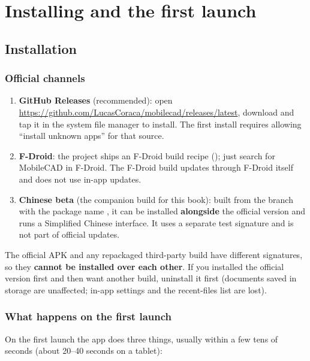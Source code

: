 \chapter{Installing and the first launch}

\section{Installation}

\subsection{Official channels}

\begin{enumerate}
  \item \textbf{GitHub Releases} (recommended): open
        \url{https://github.com/LucasCoraca/mobilecad/releases/latest}, download
         and tap it in the system file manager to install. The first install
        requires allowing “install unknown apps” for that source.
  \item \textbf{F-Droid}: the project ships an F-Droid build recipe (); just search for
        MobileCAD in F-Droid. The F-Droid build updates through F-Droid itself and does not use in-app
        updates.
  \item \textbf{Chinese beta} (the companion build for this book): built from the  branch
        with the package name , it can be installed \textbf{alongside} the official
        version and runs a Simplified Chinese interface. It uses a separate test signature and is not part of
        official updates.
\end{enumerate}

\begin{warn}
The official APK and any repackaged third-party build have different signatures, so they \textbf{cannot be
installed over each other}. If you installed the official version first and then want another build,
uninstall it first (documents saved in storage are unaffected; in-app settings and the recent-files list are
lost).
\end{warn}

\subsection{What happens on the first launch}

On the first launch the app does three things, usually within a few tens of seconds (about 20--40 seconds on a
tablet):

